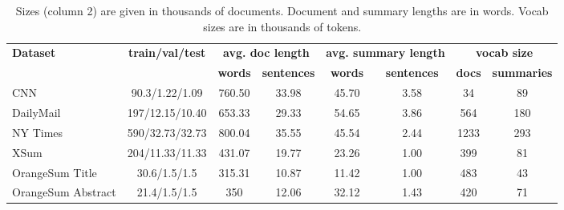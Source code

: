 \documentclass[11pt,a4paper]{article}
\begin{document}
\begin{table*}[ht]
\small
  \begin{center}{
  \begin{tabular}{| l | c | c c | c c | c c|}
    \hline
    \multirow{2}{*}{\textbf{Dataset}} & \multirow{2}{*}{\textbf{train/val/test}} & \multicolumn{2}{c|}{\textbf{avg. doc length}} & \multicolumn{2}{c|}{\textbf{avg. summary length}} & \multicolumn{2}{c|}{\textbf{vocab size}}\\
    & & \textbf{words} & \textbf{sentences} & \textbf{words} & \textbf{sentences} & \textbf{docs} & \textbf{summaries}\\ \hline 
    CNN &90.3/1.22/1.09&760.50&33.98&45.70&3.58&34&89 \\
    DailyMail &197/12.15/10.40&653.33&29.33&54.65&3.86&564&180 \\
    NY Times &590/32.73/32.73&800.04&35.55&45.54&2.44&1233&293 \\
    \hline
    XSum & 204/11.33/11.33&431.07&19.77&23.26&1.00&399&81 \\
    OrangeSum Title & 30.6/1.5/1.5 & 315.31 & 10.87 & 11.42 & 1.00 & 483 & 43 \\
    OrangeSum Abstract & 21.4/1.5/1.5 & 350 & 12.06 & 32.12 & 1.43 & 420 & 71 \\
    \hline
  \end{tabular}}
  \end{center}
  \caption{Sizes (column 2) are given in thousands of documents. Document and summary lengths are in words. Vocab sizes are in thousands of tokens. \label{table:orangesum_1}}
\end{table*}
\end{document}
